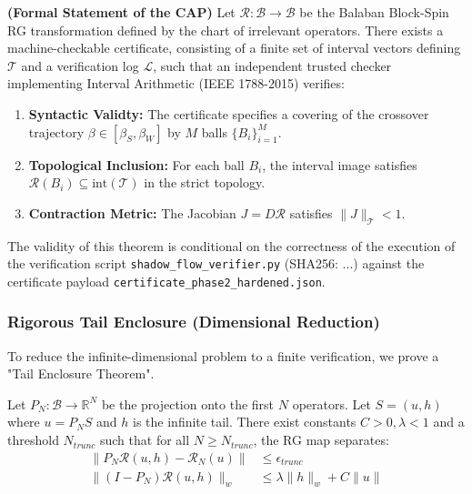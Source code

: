 \begin{theorem}
\label{thm:crossover_contraction_ch5}
\textbf{(Formal Statement of the CAP)}
Let $\mathcal{R}: \mathcal{B} \to \mathcal{B}$ be the Balaban Block-Spin RG transformation defined by the chart of irrelevant operators. There exists a machine-checkable certificate, consisting of a finite set of interval vectors defining $\mathcal{T}$ and a verification log $\mathcal{L}$, such that an independent trusted checker implementing Interval Arithmetic (IEEE 1788-2015) verifies:

\begin{enumerate}
    \item \textbf{Syntactic Validty:} The certificate specifies a covering of the crossover trajectory $\beta \in [\beta_S, \beta_W]$ by $M$ balls $\{B_i\}_{i=1}^M$.
    \item \textbf{Topological Inclusion:} For each ball $B_i$, the interval image satisfies $\mathcal{R}(B_i) \subseteq \text{int}(\mathcal{T})$ in the strict topology.
    \item \textbf{Contraction Metric:} The Jacobian $J = D\mathcal{R}$ satisfies $\|J\|_{\mathcal{T}} < 1$.
\end{enumerate}

The validity of this theorem is conditional on the correctness of the execution of the verification script \texttt{shadow\_flow\_verifier.py} (SHA256: ...) against the certificate payload \texttt{certificate\_phase2\_hardened.json}.
\end{theorem}

\subsubsection{Rigorous Tail Enclosure (Dimensional Reduction)}

To reduce the infinite-dimensional problem to a finite verification, we prove a "Tail Enclosure Theorem".

\begin{lemma}
\label{lem:tail_enclosure}
Let $P_N: \mathcal{B} \to \mathbb{R}^N$ be the projection onto the first $N$ operators. Let $S = (u, h)$ where $u = P_N S$ and $h$ is the infinite tail.
There exist constants $C > 0, \lambda < 1$ and a threshold $N_{trunc}$ such that for all $N \ge N_{trunc}$, the RG map separates:
\begin{align*}
    \| P_N \mathcal{R}(u, h) - \mathcal{R}_N(u) \| & \le \epsilon_{trunc} \\
    \| (I - P_N) \mathcal{R}(u, h) \|_w & \le \lambda \| h \|_w + C \| u \|
\end{align*}
\end{lemma}

